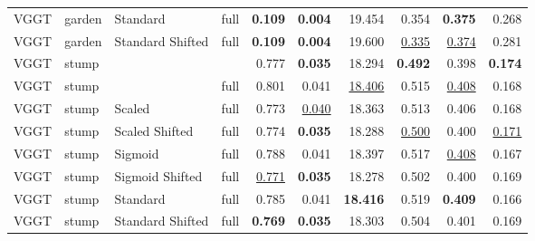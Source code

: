\begin{table}[H]
\begin{tabular}{llllrrrrrr}
VGGT & garden & Standard & full & \textbf{0.109} & \textbf{0.004} & 19.454 & 0.354 & \textbf{0.375} & 0.268 \\
VGGT & garden & Standard Shifted & full & \textbf{0.109} & \textbf{0.004} & 19.600 & \underline{0.335} & \underline{0.374} & 0.281 \\
\midrule
VGGT & stump &  &  & 0.777 & \textbf{0.035} & 18.294 & \textbf{0.492} & 0.398 & \textbf{0.174} \\
VGGT & stump &  & full & 0.801 & 0.041 & \underline{18.406} & 0.515 & \underline{0.408} & 0.168 \\
VGGT & stump & Scaled & full & 0.773 & \underline{0.040} & 18.363 & 0.513 & 0.406 & 0.168 \\
VGGT & stump & Scaled Shifted & full & 0.774 & \textbf{0.035} & 18.288 & \underline{0.500} & 0.400 & \underline{0.171} \\
VGGT & stump & Sigmoid & full & 0.788 & 0.041 & 18.397 & 0.517 & \underline{0.408} & 0.167 \\
VGGT & stump & Sigmoid Shifted & full & \underline{0.771} & \textbf{0.035} & 18.278 & 0.502 & 0.400 & 0.169 \\
VGGT & stump & Standard & full & 0.785 & 0.041 & \textbf{18.416} & 0.519 & \textbf{0.409} & 0.166 \\
VGGT & stump & Standard Shifted & full & \textbf{0.769} & \textbf{0.035} & 18.303 & 0.504 & 0.401 & 0.169 \\
\bottomrule
\end{tabular}
\end{table}